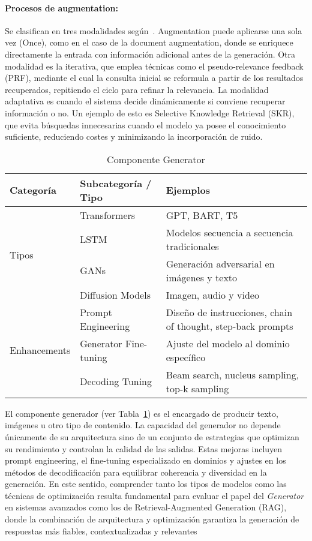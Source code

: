 \paragraph{Procesos de augmentation:} Se clasifican en tres modalidades según~\textcite{zhao2024rag}. 
Augmentation puede aplicarse una sola vez (Once), como en el caso de la document augmentation, 
donde se enriquece directamente la entrada con información adicional antes de la generación. 
Otra modalidad es la iterativa, que emplea técnicas como el pseudo-relevance feedback (PRF), 
mediante el cual la consulta inicial se reformula a partir de los resultados recuperados, repitiendo el ciclo 
para refinar la relevancia. 
La modalidad adaptativa es cuando el sistema decide dinámicamente si conviene recuperar 
información o no. Un ejemplo de esto es Selective Knowledge Retrieval (SKR), que evita búsquedas 
innecesarias cuando el modelo ya posee el conocimiento suficiente, reduciendo costes y minimizando la 
incorporación de ruido.


\begin{table}[htbp]
\centering
\begin{tabularx}{\textwidth}{l l X}
\toprule
\textbf{Categoría} & \textbf{Subcategoría / Tipo} & \textbf{Ejemplos} \\ \midrule
\multirow{4}{*}{Tipos} 
  & Transformers      & GPT, BART, T5 \\
  & LSTM             & Modelos secuencia a secuencia tradicionales \\
  & GANs            & Generación adversarial en imágenes y texto \\
  & Diffusion Models  & Imagen, audio y video \\ \midrule
\multirow{3}{*}{Enhancements}
  & Prompt Engineering   & Diseño de instrucciones, chain of thought, step-back prompts \\
  & Generator Fine-tuning& Ajuste del modelo al dominio específico \\
  & Decoding Tuning      & Beam search, nucleus sampling, top-k sampling \\ \bottomrule
\end{tabularx}
\caption{Componente Generator}
\label{tab:generator}
\end{table}

El componente generador (ver Tabla~\ref{tab:generator}) es el encargado de producir texto, imágenes u otro tipo de contenido. La capacidad del generador no depende únicamente de su arquitectura sino de un conjunto 
de estrategias que optimizan su rendimiento y controlan la calidad de las salidas. Estas mejoras incluyen prompt engineering, el fine-tuning especializado en dominios y 
ajustes en los métodos de decodificación para equilibrar coherencia y diversidad en la generación. En este sentido, comprender tanto los tipos de modelos como las técnicas de optimización resulta fundamental para evaluar el papel del \textit{Generator} 
en sistemas avanzados como los de Retrieval-Augmented Generation (RAG), donde la combinación de arquitectura y optimización garantiza la generación de respuestas 
más fiables, contextualizadas y relevantes 
\parencite{casola2022pretrained,fan2024ragllm,zhang2025hallucination}

